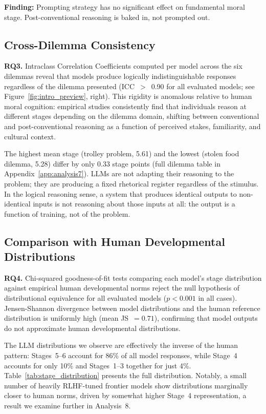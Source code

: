 \documentclass{article}
\begin{document}
\textbf{Finding:} Prompting strategy has no significant effect on fundamental moral stage. Post-conventional reasoning is baked in, not prompted out.

\subsection{Cross-Dilemma Consistency}

\textbf{RQ3.} Intraclass Correlation Coefficients computed per model across the six dilemmas reveal that models produce logically indistinguishable responses regardless of the dilemma presented (ICC~$>$~0.90 for all evaluated models; see Figure~\ref{fig:intro_preview}, right). This rigidity is anomalous relative to human moral cognition: empirical studies consistently find that individuals reason at different stages depending on the dilemma domain, shifting between conventional and post-conventional reasoning as a function of perceived stakes, familiarity, and cultural context.

The highest mean stage (trolley problem, 5.61) and the lowest (stolen food dilemma, 5.28) differ by only 0.33 stage points (full dilemma table in Appendix~\ref{app:analysis7}). LLMs are not adapting their reasoning to the problem; they are producing a fixed rhetorical register regardless of the stimulus. In the logical reasoning sense, a system that produces identical outputs to non-identical inputs is not reasoning about those inputs at all: the output is a function of training, not of the problem.

\subsection{Comparison with Human Developmental Distributions}

\textbf{RQ4.} Chi-squared goodness-of-fit tests comparing each model's stage distribution against empirical human developmental norms reject the null hypothesis of distributional equivalence for all evaluated models ($p < 0.001$ in all cases). Jensen-Shannon divergence between model distributions and the human reference distribution is uniformly high (mean JS~$= 0.71$), confirming that model outputs do not approximate human developmental distributions.

The LLM distributions we observe are effectively the inverse of the human pattern: Stages~5--6 account for 86\% of all model responses, while Stage~4 accounts for only 10\% and Stages~1--3 together for just 4\%. Table~\ref{tab:stage_distribution} presents the full distribution. Notably, a small number of heavily RLHF-tuned frontier models show distributions marginally closer to human norms, driven by somewhat higher Stage~4 representation, a result we examine further in Analysis~8.
\end{document}
